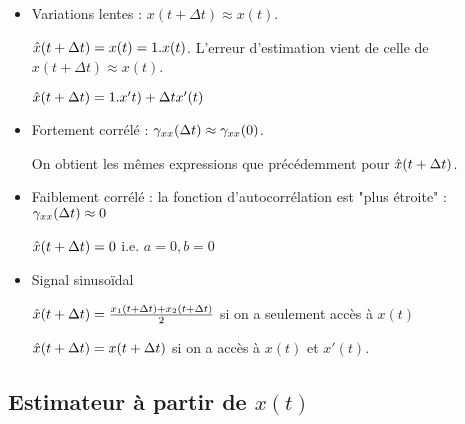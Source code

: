 \documentclass[main.tex]{subfiles}
\begin{document}
\begin{itemize}
\item Variations lentes : $x(t+\Delta t) \approx x(t)$.

$\hat{x}(t+\Delta t) = x(t) = 1.x(t)$. L'erreur d'estimation vient de celle de $x(t+\Delta t) \approx x(t)$.

$\hat{x}(t+\Delta t) = 1.x't) + \Delta t x'(t)$

\item Fortement corrélé : $\gamma_{xx}(\Delta t) \approx \gamma_{xx}(0)$. 

On obtient les mêmes expressions que précédemment pour $\hat{x}(t+\Delta t)$.

\item Faiblement corrélé : la fonction d'autocorrélation est "plus étroite" : $\gamma_{xx}(\Delta t) \approx 0$

$\hat{x}(t+\Delta t) = 0$ i.e. $a=0,b=0$

\item Signal sinusoïdal

$\hat{x}(t+\Delta t) = \frac{x_1(t+\Delta t) + x_2(t+\Delta t)}{2}$ si on a seulement accès à $x(t)$

$\hat{x}(t+\Delta t) = x(t+\Delta t)$ si on a accès à $x(t)$ et $x'(t)$.
\end{itemize}

\subsection{Estimateur à partir de $x(t)$}
\end{document}
